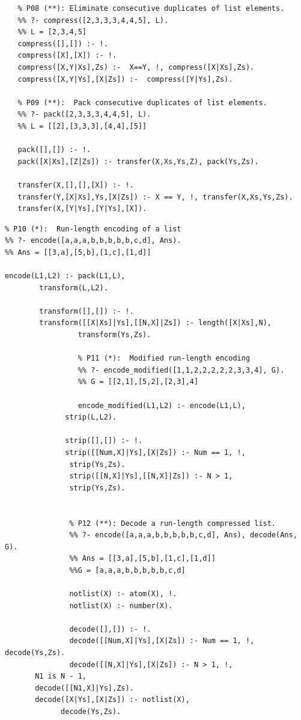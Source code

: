 \documentclass[a4paper,12pt]{book}
\begin{document}
\begin{verbatim}
   % P08 (**): Eliminate consecutive duplicates of list elements.
   %% ?- compress([2,3,3,3,4,4,5], L).
   %% L = [2,3,4,5]
   compress([],[]) :- !.
   compress([X],[X]) :- !.
   compress([X,Y|Xs],Zs) :-  X==Y, !, compress([X|Xs],Zs).
   compress([X,Y|Ys],[X|Zs]) :-  compress([Y|Ys],Zs).

   % P09 (**):  Pack consecutive duplicates of list elements.
   %% ?- pack([2,3,3,3,4,4,5], L).
   %% L = [[2],[3,3,3],[4,4],[5]]

   pack([],[]) :- !.
   pack([X|Xs],[Z|Zs]) :- transfer(X,Xs,Ys,Z), pack(Ys,Zs).

   transfer(X,[],[],[X]) :- !.
   transfer(Y,[X|Xs],Ys,[X|Zs]) :- X == Y, !, transfer(X,Xs,Ys,Zs).
   transfer(X,[Y|Ys],[Y|Ys],[X]).
\end{verbatim}

\begin{verbatim}
% P10 (*):  Run-length encoding of a list
%% ?- encode([a,a,a,b,b,b,b,b,c,d], Ans).
%% Ans = [[3,a],[5,b],[1,c],[1,d]]

encode(L1,L2) :- pack(L1,L),
	    transform(L,L2).

	    transform([],[]) :- !.
	    transform([[X|Xs]|Ys],[[N,X]|Zs]) :- length([X|Xs],N),
			     transform(Ys,Zs).

			     % P11 (*):  Modified run-length encoding
			     %% ?- encode_modified([1,1,2,2,2,2,2,3,3,4], G).
			     %% G = [[2,1],[5,2],[2,3],4]

			     encode_modified(L1,L2) :- encode(L1,L),
		      strip(L,L2).

		      strip([],[]) :- !.
		      strip([[Num,X]|Ys],[X|Zs]) :- Num == 1, !,
		       strip(Ys,Zs).
		       strip([[N,X]|Ys],[[N,X]|Zs]) :- N > 1,
			   strip(Ys,Zs).


			   % P12 (**): Decode a run-length compressed list.
			   %% ?- encode([a,a,a,b,b,b,b,b,c,d], Ans), decode(Ans, G).
			   %% Ans = [[3,a],[5,b],[1,c],[1,d]]
			   %%G = [a,a,a,b,b,b,b,b,c,d]

			   notlist(X) :- atom(X), !.
			   notlist(X) :- number(X).

			   decode([],[]) :- !.
			   decode([[Num,X]|Ys],[X|Zs]) :- Num == 1, !, decode(Ys,Zs).
			   decode([[N,X]|Ys],[X|Zs]) :- N > 1, !,
	   N1 is N - 1,
	   decode([[N1,X]|Ys],Zs).
	   decode([X|Ys],[X|Zs]) :- notlist(X),
			 decode(Ys,Zs).
\end{verbatim}
\pagebreak
\end{document}
